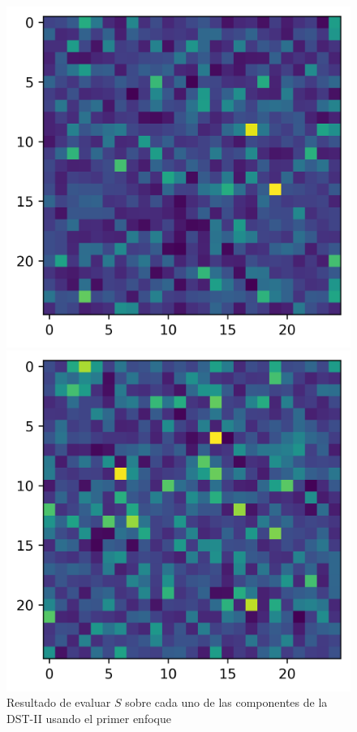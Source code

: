 \begin{figure}
\begin{multicols}{2}
    \end{multicols}
\begin{multicols}{2}
    \includegraphics[width=\linewidth]{Graphics/gaussian-2d-experiment-vertical.png}\par
    \includegraphics[width=\linewidth]{Graphics/gaussian-2d-experiment-diagonal.png}\par
\end{multicols}
\caption{Resultado de evaluar $S$ sobre cada uno de las componentes de la DST-II usando el primer enfoque} \label{fig:gaussian-example-approach1}
\end{figure}


